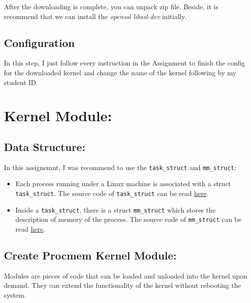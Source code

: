 \documentclass[a4paper, 11pt]{article}
\begin{document}
\par{After the downloading is complete, you can unpack zip file. Beside, it is recommend that we can install the \textit{openssl libssl-dev} initially.}

\bigbreak
\subsection{Configuration}

\par{In this step, I just follow every instruction in the Assignment to finish the config for the downloaded kernel and change the name of the kernel following by my student ID.}


\section{Kernel Module:}

\subsection{Data Structure:}

\par{In this assignemnt, I was recommend to use the \texttt{task\_struct} and \texttt{mm\_struct}:}

\begin{itemize}
    \item Each process running under a Linux machine is associated with a struct \texttt{task\_struct}. The source code of \texttt{task\_struct} can be read \href{https://github.com/torvalds/linux/blob/a13f0655503a4a89df67fdc7cac6a7810795d4b3/include/linux/sched.h#L585}{here}.
    \item Inside a \texttt{task\_struct}, there is a struct \texttt{mm\_struct} which stores the description of memory of the process. The source code of \texttt{mm\_struct} can be read \href{https://github.com/torvalds/linux/blob/a13f0655503a4a89df67fdc7cac6a7810795d4b3/include/linux/mm_types.h#L351}{here}.
\end{itemize}

\subsection{Create Procmem Kernel Module:}

\par{Modules are pieces of code that can be loaded and unloaded into the kernel upon demand. They can extend the functionality of the kernel without rebooting the system.}
\end{document}
